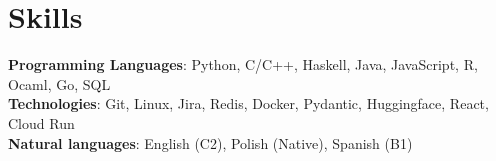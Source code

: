 \documentclass[letterpaper,11pt]{article}
\begin{document}
\section{Skills}
\begin{itemize}[leftmargin=0.15in, label={}]
  \small{\item{
                \textbf{Programming Languages}{: Python, C/C++, Haskell, Java, JavaScript, R,  Ocaml, Go, SQL} \\
                \textbf{Technologies}{: Git, Linux, Jira, Redis, Docker, Pydantic, Huggingface, React, Cloud Run} \\
                \textbf{Natural languages}{: English (C2), Polish (Native), Spanish (B1) } \\
          }}
\end{itemize}
\vspace{-20pt}
\end{document}
